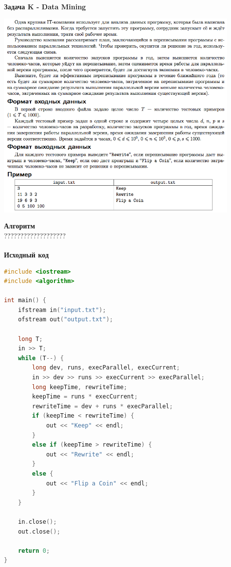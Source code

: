 \documentclass[a4paper,12pt]{article}
\begin{document}
\textbf{{\large Задача K - Data Mining}} \\
\begin{center}
\includegraphics[width=0.9\textwidth]{OC_Udmurtia/OC_Udmurtia_K.png}\\ [1cm]
\end{center}
\newpage

\textbf{{\large Алгоритм}} \\
{\Huge ???????????????????} \\ 
\\
\textbf{{\large Исходный код}}
\begin{lstlisting}[language=C++]
#include <iostream>
#include <algorithm>

int main() {
    ifstream in("input.txt");
    ofstream out("output.txt");

    long T;
    in >> T;
    while (T--) {
        long dev, runs, execParallel, execCurrent;
        in >> dev >> runs >> execCurrent >> execParallel;
        long keepTime, rewriteTime;
        keepTime = runs * execCurrent;
        rewriteTime = dev + runs * execParallel;
        if (keepTime < rewriteTime) {
            out << "Keep" << endl;
        }
        else if (keepTime > rewriteTime) {
            out << "Rewrite" << endl;
        }
        else {
            out << "Flip a Coin" << endl;
        }
    }

    in.close();
    out.close();

    return 0;
}
\end{lstlisting}
\end{document}
